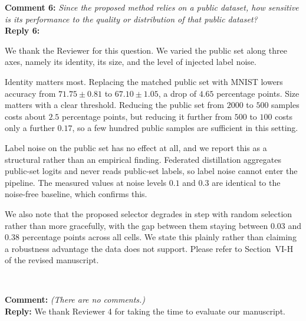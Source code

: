 \documentclass[10pt]{article}
\begin{document}
\noindent
\textbf{Comment 6:} \textit{Since the proposed method relies on a public dataset, how sensitive is its performance to the quality or distribution of that public dataset?} \\
\noindent
\textbf{Reply 6:} {We thank the Reviewer for this question. We varied the public set along three axes, namely its identity, its size, and the level of injected label noise.

Identity matters most. Replacing the matched public set with MNIST lowers accuracy from $71.75 \pm 0.81$ to $67.10 \pm 1.05$, a drop of $4.65$ percentage points. Size matters with a clear threshold. Reducing the public set from $2000$ to $500$ samples costs about $2.5$ percentage points, but reducing it further from $500$ to $100$ costs only a further $0.17$, so a few hundred public samples are sufficient in this setting.

Label noise on the public set has no effect at all, and we report this as a structural rather than an empirical finding. Federated distillation aggregates public-set logits and never reads public-set labels, so label noise cannot enter the pipeline. The measured values at noise levels $0.1$ and $0.3$ are identical to the noise-free baseline, which confirms this.

We also note that the proposed selector degrades in step with random selection rather than more gracefully, with the gap between them staying between $0.03$ and $0.38$ percentage points across all cells. We state this plainly rather than claiming a robustness advantage the data does not support. Please refer to Section~VI-H of the revised manuscript.}\\


\noindent
\textbf{Comment:} \textit{(There are no comments.)} \\
\noindent
\textbf{Reply:} {We thank Reviewer 4 for taking the time to evaluate our manuscript.}\\

\end{document}
